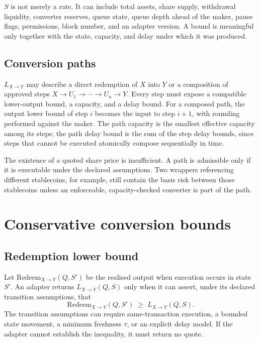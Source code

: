\documentclass[10pt,twocolumn]{article}
\theoremstyle{definition}
\newcommand{\Lb}{L_{X\to Y}}
\begin{document}
\medskip
$S$ is not merely a rate. It can include total assets, share supply, withdrawal liquidity, converter reserves,
queue state, queue depth ahead of the maker, pause flags, permissions, block number, and an adapter version. A
bound is meaningful only together with the state, capacity, and delay under which it was produced.

\subsection{Conversion paths}

$\Lb$ may describe a direct redemption of $X$ into $Y$ or a composition of approved steps
$X \to U_1 \to \cdots \to U_n \to Y$. Every step must expose a compatible lower-output bound, a capacity, and a
delay bound. For a composed path, the output lower bound of step $i$ becomes the input to step $i{+}1$, with
rounding performed against the maker. The path capacity is the smallest effective capacity among its steps; the
path delay bound is the sum of the step delay bounds, since steps that cannot be executed atomically compose
sequentially in time.

The existence of a quoted share price is insufficient. A path is admissible only if it is executable under the
declared assumptions. Two wrappers referencing different stablecoins, for example, still contain the basis risk
between those stablecoins unless an enforceable, capacity-checked converter is part of the path.

\section{Conservative conversion bounds}

\subsection{Redemption lower bound}

Let $\mathrm{Redeem}_{X\to Y}(Q,S')$ be the realised output when execution occurs in state $S'$. An adapter
returns $\Lb(Q,S)$ only when it can assert, under its declared transition assumptions, that
\[
  \mathrm{Redeem}_{X\to Y}(Q,S') \;\ge\; \Lb(Q,S).
\]
The transition assumptions can require same-transaction execution, a bounded state movement, a minimum freshness
$\tau$, or an explicit delay model. If the adapter cannot establish the inequality, it must return no quote.
\end{document}

